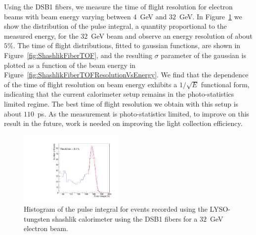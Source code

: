 \documentclass[11pt]{article}
\begin{document}
{Using the DSB1 fibers, we measure the time of flight resolution
for electron beams with beam energy varying between $4$~GeV and $32$~GeV.
In Figure~\ref{fig:ShashlikFiberEnergy32GeV} we show the distribution
of the pulse integral, a quantity proportional to the measured energy,
for the $32$~GeV beam and observe an energy resolution of about $5\%$.
The time of flight distributions, fitted to gaussian functions,
are shown in Figure~\ref{fig:ShashlikFiberTOF}, and the resulting
$\sigma$ parameter of the gaussian is plotted as a function of the
beam energy in Figure~\ref{fig:ShashlikFiberTOFResolutionVsEnergy}.
We find that the dependence of the time of flight resolution on
beam energy exhibits a $1/\sqrt{E}$ functional form, indicating
that the current calorimeter setup remains in the photo-statistics
limited regime. The best time of flight resolution we obtain
with this setup is about $110$~ps. As the measurement is photo-statistics
limited, to improve on this result in the future, work is needed
on improving the light collection efficiency. 

\begin{figure}[h] \centering
\includegraphics[width=0.45\textwidth]{figs/TOF_ShashlikDSB1Fiber_Electron_32GeV_energy} 
\caption{ Histogram of the pulse integral for events recorded using
the LYSO-tungsten shashlik calorimeter using the DSB1 fibers for 
a $32$~GeV electron beam. } 
\label{fig:ShashlikFiberEnergy32GeV}
\end{figure}

}
\end{document}
